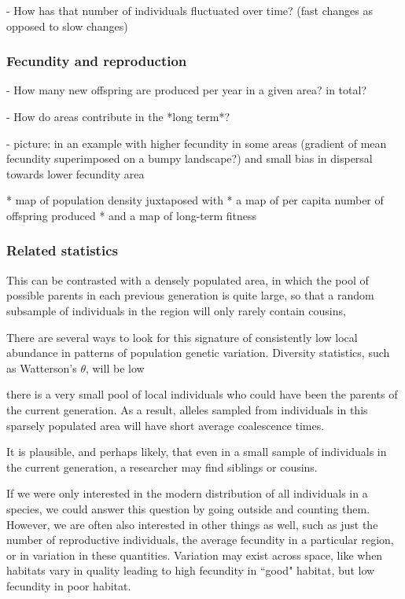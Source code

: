 \documentclass{ar-1col}
\begin{document}
        - How has that number of individuals fluctuated over time? (fast changes as opposed to slow changes)

\subsubsection{Fecundity and reproduction}
        - How many new offspring are produced per year in a given area? in total?

        - How do areas contribute in the *long term*?

        - picture:
            in an example with higher fecundity in some areas
            (gradient of mean fecundity superimposed on a bumpy landscape?)
            and small bias in dispersal towards lower fecundity area

            * map of population density juxtaposed with
            * a map of per capita number of offspring produced
            * and a map of long-term fitness
           
\subsubsection{Related statistics}

This can be contrasted with a densely populated area,
in which the pool of possible parents in each previous generation is quite large,
so that a random subsample of individuals in the region
will only rarely contain cousins,




There are several ways to look for this signature
of consistently low local abundance
in patterns of population genetic variation.
Diversity statistics, such as Watterson's $\theta$,
will be low



there is a very small pool of local individuals who could
have been the parents of the current generation.
As a result, alleles sampled from individuals in this sparsely populated area
will have short average coalescence times.


It is plausible, and perhaps likely,
that even in a small sample of individuals in the current generation,
a researcher may find siblings or cousins.

If we were only interested in
the modern distribution of all individuals in a species,
we could answer this question by going outside and counting them.
However, we are often also interested in other things as well,
such as just the number of reproductive individuals,
the average fecundity in a particular region,
or in variation in these quantities.
Variation may exist across space,
like when habitats vary in quality
leading to high fecundity in ``good" habitat,
but low fecundity in poor habitat.
\end{document}
